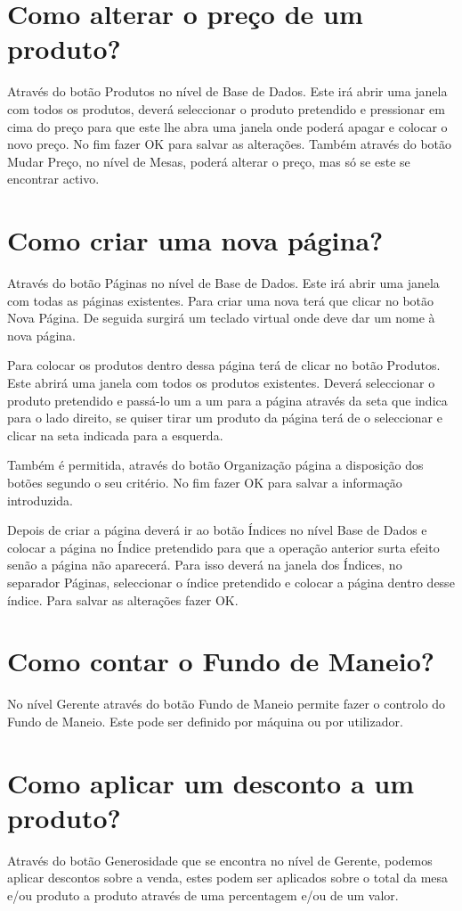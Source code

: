 \documentclass[a4paper,11pt,openany]{memoir}
\begin{document}
\section{Como alterar o preço de um produto?}

Através do botão Produtos no nível de Base de Dados. Este irá abrir uma janela com
todos os produtos, deverá seleccionar o produto pretendido e pressionar em cima do
preço para que este lhe abra uma janela onde poderá apagar e colocar o novo
preço. No fim fazer OK para salvar as alterações. Também através do botão Mudar
Preço, no nível de Mesas, poderá alterar o preço, mas só se este se encontrar
activo.

\section{Como criar uma nova página?}
Através do botão Páginas no nível de Base de Dados. 
Este irá abrir uma janela com
todas as páginas existentes. Para criar uma nova terá que clicar no botão Nova
Página. De seguida surgirá um teclado virtual onde deve dar um nome à nova
página. 

Para colocar os produtos dentro dessa página terá de clicar no botão
Produtos. Este abrirá uma janela com todos os produtos existentes. Deverá
seleccionar o produto pretendido e passá-lo um a um para a página através da seta
que indica para o lado direito, se quiser tirar um produto da página terá de o
seleccionar e clicar na seta indicada para a esquerda. 

Também é permitida, através
do botão Organização página a disposição dos botões segundo o seu critério. No fim
fazer OK para salvar a informação introduzida. 

Depois de criar a página deverá ir ao
botão Índices no nível Base de Dados e colocar a página no Índice pretendido para
que a operação anterior surta efeito senão a página não aparecerá. Para isso deverá
na janela dos Índices, no separador Páginas, seleccionar o índice pretendido e
colocar a página dentro desse índice. Para salvar as alterações fazer OK.

\section{Como contar o Fundo de Maneio?}
No nível Gerente através do botão Fundo de Maneio permite fazer o controlo do
Fundo de Maneio. Este pode ser definido por máquina ou por utilizador.

\section{Como aplicar um desconto a um produto?}
Através do botão Generosidade que se encontra no nível de Gerente, podemos
aplicar descontos sobre a venda, estes podem ser aplicados sobre o total da mesa
e/ou produto a produto através de uma percentagem e/ou de um valor.
\end{document}
